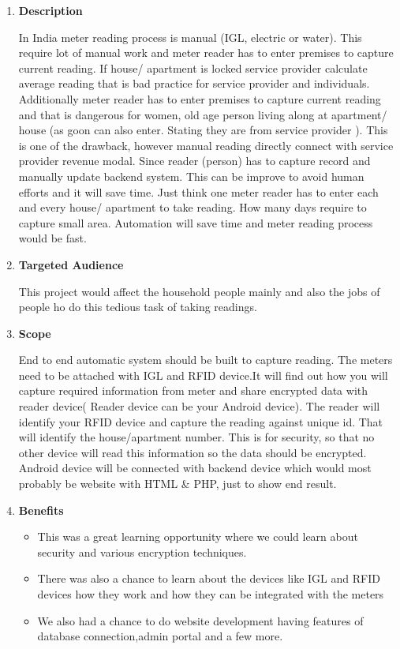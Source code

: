 \documentclass[fleqn,10pt]{../SelfArx} %
\begin{document}
\vspace{0.5cm}
\begin{enumerate}
\item \textbf{Description}


In India meter reading process is manual (IGL, electric or water). This require lot of manual work and meter reader has to enter premises to capture current reading.
If house/ apartment is locked service provider calculate average reading that is bad practice for service provider and individuals.
Additionally meter reader has to enter premises to capture current reading and that is dangerous for women, old age person living along at apartment/ house (as goon can also enter. Stating they are from service provider ). This is one of the drawback, however manual reading directly connect with service provider revenue modal. Since reader (person) has to capture record and manually update backend system. This can be improve to avoid human efforts and it will save time.
Just think one meter reader has to enter each and every house/ apartment to take reading. How many days require to capture small area. Automation will save time and meter reading process would be fast.

\item \textbf{Targeted Audience}

This project would affect the household people mainly and also the jobs of people ho do this tedious task of taking readings.

\item \textbf{Scope}

End to end automatic system should be built to capture reading. The meters need to be attached with IGL and RFID device.It will find out how you will capture required information from meter and share encrypted data with reader device( Reader device can be your Android device). The reader will identify your RFID device and capture the reading against unique id. That will identify the house/apartment number. This is for security, so that no other device will read this information so the data should be encrypted. Android device will be connected with  backend device which would most probably be  website with HTML \& PHP, just to show end result.

\item \textbf{Benefits}
\begin{itemize}
    \item This was a great learning opportunity where we could learn about security and various encryption techniques.
    \item There was also a chance to learn about the devices like IGL and RFID devices how they work and how they can be integrated with the meters
    \item We also had a chance to do website development having features of database connection,admin portal and a few more.
\end{itemize}


\end{enumerate}
\end{document}
